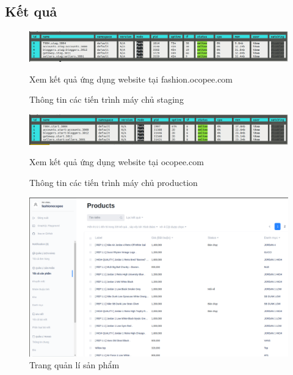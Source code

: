 \subsection{Kết quả}
\FloatBarrier
\begin{figure}[!htbp]
	\begin{center}	
		\includegraphics[width=\textwidth]{./results/vps-staging}
		\caption{Thông tin các tiến trình máy chủ staging}
	\end{center}
Xem kết quả ứng dụng website tại fashion.ocopee.com
\end{figure}
\FloatBarrier
\begin{figure}[!htbp]
	\begin{center}	
		\includegraphics[width=\textwidth]{./results/vps-production}
		\caption{Thông tin các tiến trình máy chủ production}
	\end{center}
Xem kết quả ứng dụng website tại ocopee.com
\end{figure}
\FloatBarrier
\begin{figure}[!htbp]
	\begin{center}	
		\includegraphics[width=\textwidth]{./results/product}
		\caption{Trang quản lí sản phẩm}
	\end{center}
\end{figure}
\clearpage
\FloatBarrier
